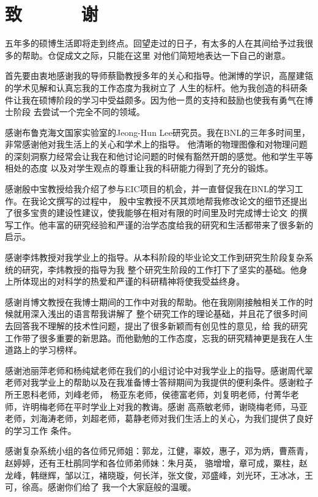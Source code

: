 \chapter*{\LARGE  \bfseries {致\ \ \ \ \ \ 谢} }


\qquad
五年多的硕博生活即将走到终点。回望走过的日子，有太多的人在其间给予过我很多的帮助。仓促成文之际，只能在这里
对他们简短地表达一下自己的谢意。

首先要由衷地感谢我的导师蔡勖教授多年的关心和指导。他渊博的学识，高屋建瓴的学术见解和认真忘我的工作态度为我树立了
人生的标杆。他为我创造的科研条件让我在硕博阶段的学习中受益颇多。因为他一贯的支持和鼓励也使我有勇气在博士阶段
去尝试一个完全不同的领域。

感谢布鲁克海文国家实验室的Jeong-Hun Lee研究员。我在BNL的三年多时间里，非常感谢他对我生活上的关心和学术上的指导。
他清晰的物理图像和对物理问题的深刻洞察力经常会让我在和他讨论问题的时候有豁然开朗的感觉。他和学生平等相处的态度
以及对学生观点的尊重让我的科研能力得到了充分的锻炼。

感谢殷中宝教授给我介绍了参与EIC项目的机会，并一直督促我在BNL的学习工作。在我论文撰写的过程中，
殷中宝教授不厌其烦地帮我修改论文的细节还提出了很多宝贵的建设性建议，使我能够在相对有限的时间里及时完成博士论文
的撰写工作。他丰富的研究经验和严谨的治学态度给我的研究和生活都带来了很多新的启示。

感谢李炜教授对我学业上的指导。从本科阶段的毕业论文工作到研究生阶段复杂系统的研究，李炜教授的指导为我
整个研究生阶段的工作打下了坚实的基础。他身上所体现出的对科学的热爱和严谨的科研精神将使我受益终身。

感谢肖博文教授在我博士期间的工作中对我的帮助。他在我刚刚接触相关工作的时候就用深入浅出的语言帮我讲解了
整个研究工作的理论基础，并且花了很多时间去回答我不理解的技术性问题，提出了很多新颖而有创见性的意见，给
我的研究工作带了很多重要的新思路。而他勤勉的工作态度，忘我的研究精神更是我在人生道路上的学习榜样。

感谢池丽萍老师和杨纯斌老师在我们的小组讨论中对我学业上的指导。感谢周代翠老师对我学业上的帮助以及在我准备博士答辩期间为我提供的便利条件。感谢粒子所王恩科老师，刘峰老师，
杨亚东老师，侯德富老师，刘复明老师，付菁华老师，许明梅老师在平时学业上对我的教诲。感谢
高燕敏老师，谢晓梅老师，马亚老师，刘海涛老师，刘超老师，葛静老师对我们生活上的关心，为我们提供了良好的学习工作
条件。

感谢复杂系统小组的各位师兄师姐：郭龙，江健，辜姣，惠子，邓为炳，曹燕青，赵婷婷，还有王杜鹃同学和各位师弟师妹：朱月英，
骆增增，章可成，粟柱，赵龙峰，韩继辉，邹以江，褚晓璇，何长洋，张文俊，邓盛峰，刘光环，王冰冰，王可，徐高。感谢你们给了
我一个大家庭般的温暖。

